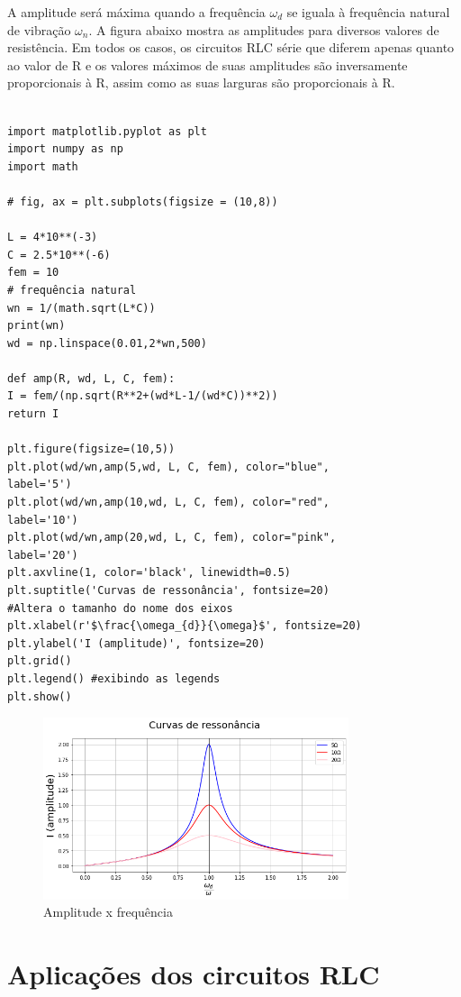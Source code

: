 A amplitude será máxima quando a frequência $\omega_{d}$ se iguala à frequência natural de vibração $\omega_{n}$. A figura abaixo mostra as amplitudes para diversos valores de resistência. Em todos os casos, os circuitos RLC série que diferem apenas quanto ao valor de R e os valores máximos de suas amplitudes são inversamente proporcionais à R, assim como as suas larguras são proporcionais à R.

\begin{verbatim}
	
import matplotlib.pyplot as plt
import numpy as np
import math

# fig, ax = plt.subplots(figsize = (10,8))

L = 4*10**(-3)
C = 2.5*10**(-6)
fem = 10
# frequência natural
wn = 1/(math.sqrt(L*C))
print(wn)
wd = np.linspace(0.01,2*wn,500)

def amp(R, wd, L, C, fem):
I = fem/(np.sqrt(R**2+(wd*L-1/(wd*C))**2)) 
return I

plt.figure(figsize=(10,5))
plt.plot(wd/wn,amp(5,wd, L, C, fem), color="blue", 
label='5')
plt.plot(wd/wn,amp(10,wd, L, C, fem), color="red", 
label='10')
plt.plot(wd/wn,amp(20,wd, L, C, fem), color="pink", 
label='20')
plt.axvline(1, color='black', linewidth=0.5)
plt.suptitle('Curvas de ressonância', fontsize=20)
#Altera o tamanho do nome dos eixos
plt.xlabel(r'$\frac{\omega_{d}}{\omega}$', fontsize=20) 
plt.ylabel('I (amplitude)', fontsize=20)
plt.grid()
plt.legend() #exibindo as legends
plt.show()
\end{verbatim}

\begin{figure}[H]
	\centering
	\includegraphics[width=0.8\textwidth]{./Imagens/RLC/rlc4.png} 
	\caption{Amplitude x frequência}
	\label{fig:RLC4}
\end{figure}

\section{Aplicações dos circuitos RLC}

